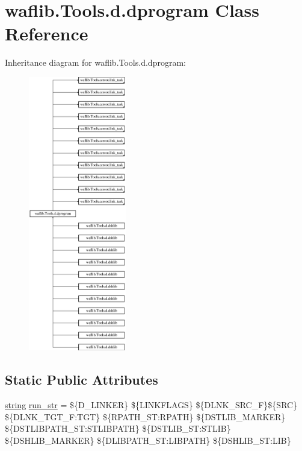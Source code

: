 \hypertarget{classwaflib_1_1_tools_1_1d_1_1dprogram}{}\section{waflib.\+Tools.\+d.\+dprogram Class Reference}
\label{classwaflib_1_1_tools_1_1d_1_1dprogram}
Inheritance diagram for waflib.\+Tools.\+d.\+dprogram\+:\begin{figure}[H]
\begin{center}
\leavevmode
\includegraphics[height=12.000000cm]{classwaflib_1_1_tools_1_1d_1_1dprogram}
\end{center}
\end{figure}
\subsection*{Static Public Attributes}
\begin{DoxyCompactItemize}
\item 
\hyperlink{test__lib_f_l_a_c_2format_8c_ab02026ad0de9fb6c1b4233deb0a00c75}{string} \hyperlink{classwaflib_1_1_tools_1_1d_1_1dprogram_a54f16f9316f20aa540b9611022450726}{run\+\_\+str} = \textquotesingle{}\$\{D\+\_\+\+L\+I\+N\+K\+ER\} \$\{L\+I\+N\+K\+F\+L\+A\+GS\} \$\{D\+L\+N\+K\+\_\+\+S\+R\+C\+\_\+F\}\$\{S\+RC\} \$\{D\+L\+N\+K\+\_\+\+T\+G\+T\+\_\+\+F\+:\+T\+GT\} \$\{R\+P\+A\+T\+H\+\_\+\+S\+T\+:\+R\+P\+A\+TH\} \$\{D\+S\+T\+L\+I\+B\+\_\+\+M\+A\+R\+K\+ER\} \$\{D\+S\+T\+L\+I\+B\+P\+A\+T\+H\+\_\+\+S\+T\+:\+S\+T\+L\+I\+B\+P\+A\+TH\} \$\{D\+S\+T\+L\+I\+B\+\_\+\+S\+T\+:\+S\+T\+L\+IB\} \$\{D\+S\+H\+L\+I\+B\+\_\+\+M\+A\+R\+K\+ER\} \$\{D\+L\+I\+B\+P\+A\+T\+H\+\_\+\+S\+T\+:\+L\+I\+B\+P\+A\+TH\} \$\{D\+S\+H\+L\+I\+B\+\_\+\+S\+T\+:\+L\+IB\}\textquotesingle{}
\end{DoxyCompactItemize}
